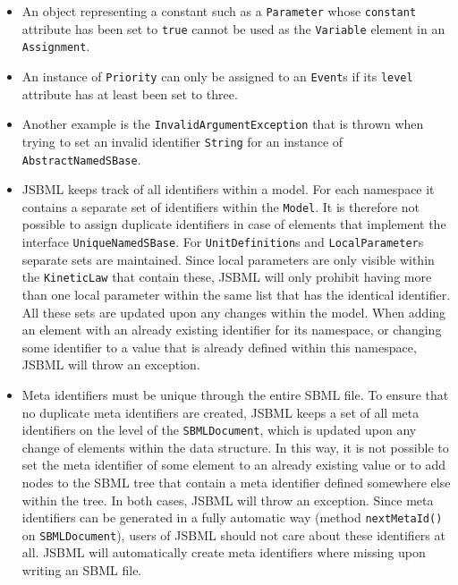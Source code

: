 \begin{itemize}
 \item An object representing a constant such as a
 \texttt{Parameter} whose \texttt{constant} attribute has been set to
\texttt{true} cannot be used as the \texttt{Variable} element in an
\texttt{Assignment}.
%
%
%
%
 \item An instance of \texttt{Priority} can only
 be assigned to an \texttt{Event}s if its
 \texttt{level} attribute has at least been set to
 three.
 \item Another example is the \texttt{InvalidArgumentException} that
 is thrown when trying to set an invalid identifier \texttt{String} for an
 instance of \texttt{AbstractNamedSBase}.
 \item JSBML keeps track of all identifiers within a model. For each namespace
 it contains a separate set of identifiers within the
 \texttt{Model}. It is therefore not possible to
 assign duplicate identifiers in case of elements that implement the interface
 \texttt{UniqueNamedSBase}.
 For \texttt{UnitDefinition}s
 and \texttt{LocalParameter}s separate sets are maintained. Since local
 parameters are only visible within the
 \texttt{KineticLaw} that contain these,
 JSBML will only prohibit having more than one local parameter within the same
 list that has the identical identifier. All these sets are updated upon any
 changes within the model. When adding an element with an already existing
 identifier for its namespace, or changing some identifier to a value that is
 already defined within this namespace, JSBML will throw an exception.
 \item Meta identifiers must be unique through the entire SBML file. To ensure
 that no duplicate meta identifiers are created, JSBML keeps a set of all meta
 identifiers on the level of the
 \texttt{SBMLDocument}, which is
 updated upon any change of elements within the data structure. In this way, it
 is not possible to set the meta identifier of some element to an already
 existing value or to add nodes to the SBML tree that contain a meta identifier
 defined somewhere else within the tree. In both cases, JSBML will throw an
 exception. Since meta identifiers can be generated in a fully automatic way
 (method \texttt{nextMetaId()} on \texttt{SBMLDocument}), users of JSBML should
 not care about these identifiers at all. JSBML will automatically create meta
 identifiers where missing upon writing an SBML file.
\end{itemize}
